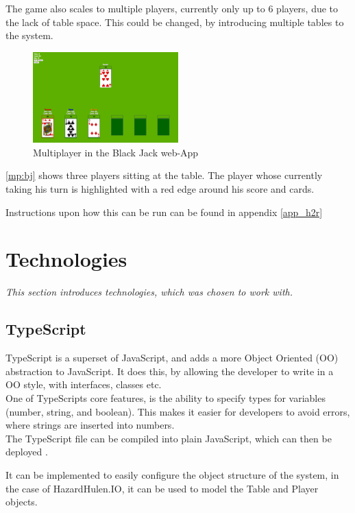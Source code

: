 \documentclass[a4paper]{article}
\begin{document}
The game also scales to multiple players, currently only up to 6 players, due to the lack of table space. This could be changed, by introducing multiple tables to the system.

\begin{figure}[hbt]
  \centering
  \includegraphics[width=0.5\textwidth]{images/multiplayer}	
  \caption{Multiplayer in the Black Jack web-App}
  \label{mp:bj}
\end{figure}

\autoref{mp:bj} shows three players sitting at the table. The player whose currently taking his turn is highlighted with a red edge around his score and cards.

Instructions upon how this can be run can be found in appendix \autoref{app_h2r}




\section{Technologies}
\label{sec_tech}
\textit{This section introduces technologies, which was chosen to work with.}
\subsection{TypeScript}
TypeScript is a superset of JavaScript, and adds a more Object Oriented (OO) abstraction to JavaScript. It does this, by allowing the developer to write in a OO style, with interfaces, classes etc.\\
One of TypeScripts core features, is the ability to specify types for variables (number, string, and boolean). This makes it easier for developers to avoid errors, where strings are inserted into numbers.\\
The TypeScript file can be compiled into plain JavaScript, which can then be deployed \cite{tsc}.

It can be implemented to easily configure the object structure of the system, in the case of HazardHulen.IO, it can be used to model the Table and Player objects.
\end{document}
